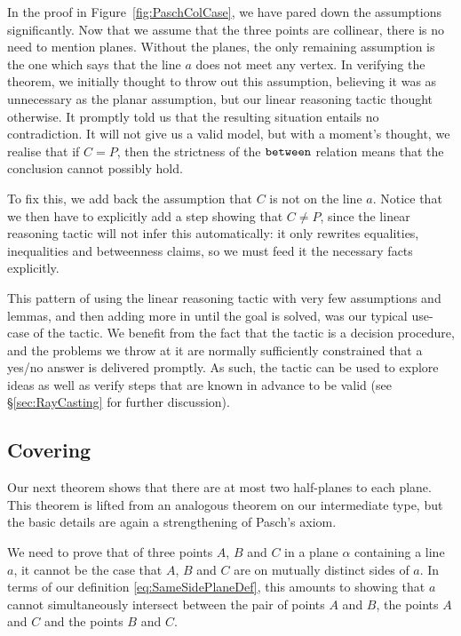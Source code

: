 In the proof in Figure~\ref{fig:PaschColCase}, we have pared down the assumptions significantly. Now that we assume that the three points are collinear, there is no need to mention planes. Without the planes, the only remaining assumption is the one which says that the line $a$ does not meet any vertex. In verifying the theorem, we initially thought to throw out this assumption, believing it was as unnecessary as the planar assumption, but our linear reasoning tactic thought otherwise. It promptly told us that the resulting situation entails no contradiction. It will not give us a valid model, but with a moment's thought, we realise that if $C = P$, then the strictness of the $\texttt{between}$ relation means that the conclusion cannot possibly hold.

To fix this, we add back the assumption that $C$ is not on the line $a$. Notice that we then have to explicitly add a step showing that $C \neq P$, since the linear reasoning tactic will not infer this automatically: it only rewrites equalities, inequalities and betweenness claims, so we must feed it the necessary facts explicitly.

This pattern of using the linear reasoning tactic with very few assumptions and lemmas, and then adding more in until the goal is solved, was our typical use-case of the tactic. We benefit from the fact that the tactic is a decision procedure, and the problems we throw at it are normally sufficiently constrained that a yes/no answer is delivered promptly. As such, the tactic can be used to explore ideas as well as verify steps that are known in advance to be valid (see \S\ref{sec:RayCasting} for further discussion).

\subsection{Covering}
Our next theorem shows that there are at most two half-planes to each plane. This theorem is lifted from an analogous theorem on our intermediate type, but the basic details are again a strengthening of Pasch's axiom.

We need to prove that of three points $A$, $B$ and $C$ in a plane $\alpha$ containing a line $a$, it cannot be the case that $A$, $B$ and $C$ are on mutually distinct sides of $a$. In terms of our definition \eqref{eq:SameSidePlaneDef}, this amounts to showing that $a$ cannot simultaneously intersect between the pair of points $A$ and $B$, the points $A$ and $C$ and the points $B$ and $C$. 

